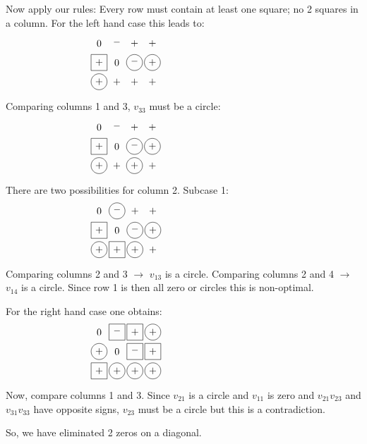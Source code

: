 Now apply our rules:  Every row must contain at least one square; no 2 squares
in a column.  For the left hand case this leads to:
\begin{equation*}
\myarrset
\begin{array}{cccc}
\ndcz & \ndcm & \ndsp & \ndcp \\
\dsp  & \ndcz & \dcm  & \dcp  \\
\dcp  & \ndcp & \ndcp & \ndsp
\end{array}
~~~~~~~~~~~~~~~~~~~~~~~~~~~~~~~~~~~
\end{equation*}
Comparing columns 1 and 3, $v_{33}$ must be a circle:
\begin{equation*}
\myarrset
\begin{array}{cccc}
\ndcz & \ndcm & \ndsp & \ndcp \\
\dsp  & \ndcz & \dcm  & \dcp  \\
\dcp  & \ndcp & \dcp  & \ndsp
\end{array}
~~~~~~~~~~~~~~~~~~~~~~~~~~~~~~~~~~~
\end{equation*}
There are two possibilities for column 2.  Subcase 1:
\begin{equation*}
\myarrset
\begin{array}{cccc}
\ndcz & \dcm  & \ndsp & \ndcp \\
\dsp  & \ndcz & \dcm  & \dcp  \\
\dcp  & \dsp  & \dcp  & \ndsp
\end{array}
~~~~~~~~~~~~~~~~~~~~~~~~~~~~~~~~~~~
\end{equation*}
Comparing columns 2 and 3 $\rightarrow$ $v_{13}$ is a circle.
Comparing columns 2 and 4 $\rightarrow$ $v_{14}$ is a circle.
Since row 1 is then all zero or circles this is non-optimal.

For the right hand case one obtains:
\begin{equation*}
\myarrset
\begin{array}{cccc}
\ndcz & \dsm  & \dsp  & \dcp  \\
\dcp  & \ndcz & \dsm  & \dsp  \\
\dsp  & \dcp  & \dcp  & \dcp
\end{array}
~~~~~~~~~~~~~~~~~~~~~~~~~~~~~~~~~~~
\end{equation*}
Now, compare columns 1 and 3.  Since $v_{21}$ is a circle and $v_{11}$ is
zero and $v_{21}v_{23}$ and $v_{31}v_{33}$ have opposite signs, $v_{23}$ must
be a circle but this is a contradiction.

So, we have eliminated 2 zeros on a diagonal.

